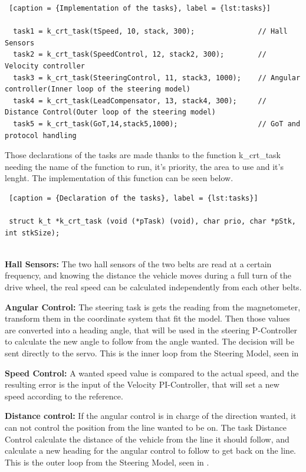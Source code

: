 \begin{lstlisting} [caption = {Implementation of the tasks}, label = {lst:tasks}]

  task1 = k_crt_task(tSpeed, 10, stack, 300);         		// Hall Sensors
  task2 = k_crt_task(SpeedControl, 12, stack2, 300); 		// Velocity controller
  task3 = k_crt_task(SteeringControl, 11, stack3, 1000); 	// Angular controller(Inner loop of the steering model)
  task4 = k_crt_task(LeadCompensator, 13, stack4, 300); 	// Distance Control(Outer loop of the steering model)
  task5 = k_crt_task(GoT,14,stack5,1000);        		    // GoT and protocol handling

\end{lstlisting}

Those declarations of the tasks are made thanks to the function k\_crt\_task needing the name of the function to run, it's priority, the area to use and it's lenght. The implementation of this function can be seen below.


\begin{lstlisting} [caption = {Declaration of the tasks}, label = {lst:tasks}]

 struct k_t *k_crt_task (void (*pTask) (void), char prio, char *pStk, int stkSize);
 
\end{lstlisting}

\textbf{Hall Sensors:}
The two hall sensors of the two belts are read at a certain frequency, and knowing the distance the vehicle moves during a full turn of the drive wheel, the real speed can be calculated independently from each other belts.

\textbf{Angular Control:}
The steering task is gets the reading from the magnetometer, transform them in the coordinate system that fit the model. Then those values are converted into a heading angle, that will be used in the steering P-Controller to calculate the new angle to follow from the angle wanted. The decision will be sent directly to the servo. This is the inner loop from the Steering Model, seen in 

\textbf{Speed Control:}
A wanted speed value is compared to the actual speed, and the resulting error is the input of the Velocity PI-Controller, that will set a new speed according to the reference.

\textbf{Distance control:}
If the angular control is in charge of the direction wanted, it can not control the position from the line wanted to be on. The task Distance Control calculate the distance of the vehicle from the line it should follow, and calculate a new heading for the angular control to follow to get back on the line. This is the outer loop from the Steering Model, seen in .

